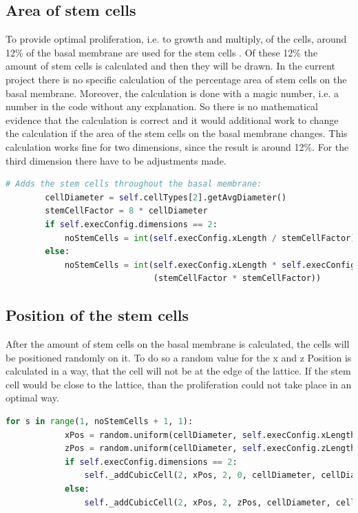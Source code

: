 \subsection{Area of stem cells}
To provide optimal proliferation, i.e. to growth and multiply, of the cells, around 12\% of the basal membrane are used for the stem cells \cite{Torelli2017}. Of these 12\% the amount of stem cells is calculated and then they will be drawn. In the current project there is no specific calculation of the percentage area of stem cells on the basal membrane. Moreover, the calculation is done with a magic number, i.e. a number in the code without any explanation. So there is no mathematical evidence that the calculation is correct and it would additional work to change the calculation if the area of the stem cells on the basal membrane changes. This calculation works fine for two dimensions, since the result is around 12\%. For the third dimension there have to be adjustments made.
\begin{lstlisting}[language=Python, caption = cell Area]
        # Adds the stem cells throughout the basal membrane:
        cellDiameter = self.cellTypes[2].getAvgDiameter()
        stemCellFactor = 8 * cellDiameter
        if self.execConfig.dimensions == 2:
            noStemCells = int(self.execConfig.xLength / stemCellFactor)
        else:
            noStemCells = int(self.execConfig.xLength * self.execConfig.yLength /
                              (stemCellFactor * stemCellFactor))

\end{lstlisting}

\subsection{Position of the stem cells}
After the amount of stem cells on the basal membrane is calculated, the cells will be positioned randomly on it. To do so a random value for the x and z Position is calculated in a way, that the cell will not be at the edge of the lattice. If the stem cell would be close to the lattice, than the proliferation could not take place in an optimal way.
\begin{lstlisting}[language=Python, caption = stem cell position]
        for s in range(1, noStemCells + 1, 1):
            xPos = random.uniform(cellDiameter, self.execConfig.xLength - cellDiameter)
            zPos = random.uniform(cellDiameter, self.execConfig.zLength - cellDiameter)
            if self.execConfig.dimensions == 2:
                self._addCubicCell(2, xPos, 2, 0, cellDiameter, cellDiameter, 0, steppable)
            else:
                self._addCubicCell(2, xPos, 2, zPos, cellDiameter, cellDiameter, cellDiameter, steppable)
\end{lstlisting}                

